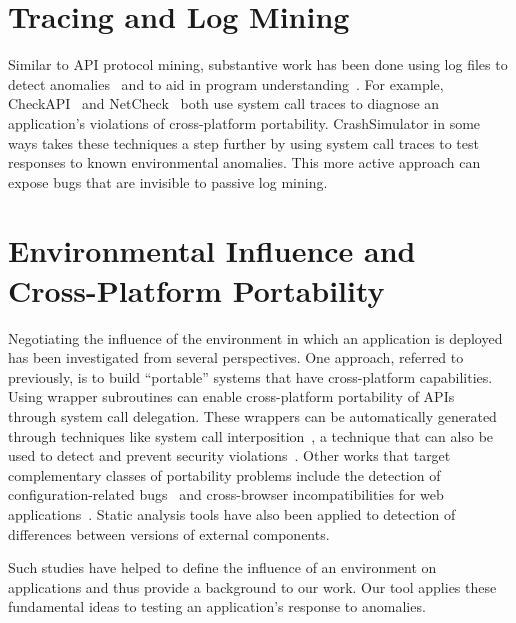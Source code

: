\section{Tracing and Log Mining}
Similar to API protocol mining, substantive work has been done using
log files to detect anomalies~\cite{pinpoint,
jiang_abnormal_trace_detection_icac_2005, xu2009detecting, lou2010mining2}
and to aid in program understanding~\cite{yuan2010sherlog,
beschastnikh_synoptic_fse_2011, csight_icse_2014}.
For example, CheckAPI~\cite{rasley2015detecting}
and NetCheck~\cite{Zhuang_NSDI_2014} both
use system call traces to diagnose an application's violations of
cross-platform portability.  CrashSimulator in some ways takes these
techniques a step further by using
system call traces
to test responses to known environmental anomalies.
This more active approach can expose bugs that
are invisible to passive log mining.


\section{Environmental Influence and Cross-Platform Portability}
Negotiating the influence of the environment in which an
application is deployed has been investigated from several
perspectives. One approach, referred to previously,
is to build ``portable'' systems
that have cross-platform capabilities.
Using wrapper subroutines
can enable cross-platform portability
of APIs~\cite{bartolomeicompliance} through system call delegation.
These wrappers can be automatically generated through techniques like
system call interposition~\cite{Guo:2011:CUS:2002181.2002202}, a
technique that can also be used to detect and prevent security
violations~\cite{Hofmeyr:1998:IDU:1298081.1298084,
Acharya:2000:MUP:1251306.1251307}.
Other works that target complementary classes of portability problems
include the detection of configuration-related bugs~\cite{skoll:icse:2004,
Yilmaz:issta:2004, Fouche:issta:2009, Kastner12, Nguyen14} and
cross-browser incompatibilities for web
applications~\cite{DBLP:conf/icsm/ChoudharyVO10, silakov2010improving,
DBLP:conf/icse/Choudhary11, Mesbah:2011:ACC:1985793.1985870,
DBLP:conf/icst/DallmeierP0MZ14}.  Static analysis tools have also been applied to
detection of differences between versions of external components.

Such studies have helped to define the influence of an environment on
applications and thus provide a background to our work.  Our tool applies
these fundamental ideas to testing an application's response to anomalies.

